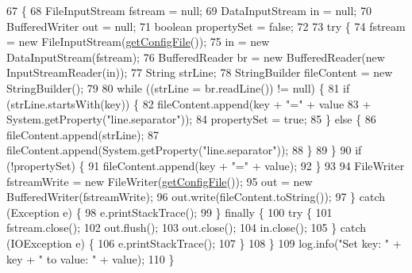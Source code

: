 \begin{DoxyCode}
67                                                              \{
68         FileInputStream fstream = null;
69         DataInputStream in = null;
70         BufferedWriter out = null;
71         \textcolor{keywordtype}{boolean} propertySet = \textcolor{keyword}{false};
72 
73         \textcolor{keywordflow}{try} \{
74             fstream = \textcolor{keyword}{new} FileInputStream(\hyperlink{classit_1_1isislab_1_1masonhelperdocumentation_1_1mason_1_1control_1_1_config_file_ac533dd01e862be359ae060d278daf1ea}{getConfigFile}());
75             in = \textcolor{keyword}{new} DataInputStream(fstream);
76             BufferedReader br = \textcolor{keyword}{new} BufferedReader(\textcolor{keyword}{new} InputStreamReader(in));
77             String strLine;
78             StringBuilder fileContent = \textcolor{keyword}{new} StringBuilder();
79 
80             \textcolor{keywordflow}{while} ((strLine = br.readLine()) != null) \{
81                 \textcolor{keywordflow}{if} (strLine.startsWith(key)) \{
82                     fileContent.append(key + \textcolor{stringliteral}{"="} + value
83                             + System.getProperty(\textcolor{stringliteral}{"line.separator"}));
84                     propertySet = \textcolor{keyword}{true};
85                 \} \textcolor{keywordflow}{else} \{
86                     fileContent.append(strLine);
87                     fileContent.append(System.getProperty(\textcolor{stringliteral}{"line.separator"}));
88                 \}
89             \}
90             \textcolor{keywordflow}{if} (!propertySet) \{
91                 fileContent.append(key + \textcolor{stringliteral}{"="} + value);
92             \}
93 
94             FileWriter fstreamWrite = \textcolor{keyword}{new} FileWriter(\hyperlink{classit_1_1isislab_1_1masonhelperdocumentation_1_1mason_1_1control_1_1_config_file_ac533dd01e862be359ae060d278daf1ea}{getConfigFile}());
95             out = \textcolor{keyword}{new} BufferedWriter(fstreamWrite);
96             out.write(fileContent.toString());
97         \} \textcolor{keywordflow}{catch} (Exception e) \{
98             e.printStackTrace();
99         \} \textcolor{keywordflow}{finally} \{
100             \textcolor{keywordflow}{try} \{
101                 fstream.close();
102                 out.flush();
103                 out.close();
104                 in.close();
105             \} \textcolor{keywordflow}{catch} (IOException e) \{
106                 e.printStackTrace();
107             \}
108         \}
109         log.info(\textcolor{stringliteral}{"Set key: "} + key + \textcolor{stringliteral}{" to value: "} + value);
110     \}
\end{DoxyCode}


